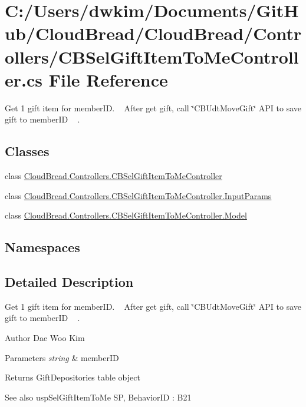 \hypertarget{a00218}{}\section{C\+:/\+Users/dwkim/\+Documents/\+Git\+Hub/\+Cloud\+Bread/\+Cloud\+Bread/\+Controllers/\+C\+B\+Sel\+Gift\+Item\+To\+Me\+Controller.cs File Reference}
\label{a00218}


Get 1 gift item for member\+ID. ~\newline
After get gift, call \char`\"{}\+C\+B\+Udt\+Move\+Gift\char`\"{} A\+PI to save gift to member\+ID ~\newline
.  


\subsection*{Classes}
\begin{DoxyCompactItemize}
\item 
class \hyperlink{a00047}{Cloud\+Bread.\+Controllers.\+C\+B\+Sel\+Gift\+Item\+To\+Me\+Controller}
\item 
class \hyperlink{a00110}{Cloud\+Bread.\+Controllers.\+C\+B\+Sel\+Gift\+Item\+To\+Me\+Controller.\+Input\+Params}
\item 
class \hyperlink{a00151}{Cloud\+Bread.\+Controllers.\+C\+B\+Sel\+Gift\+Item\+To\+Me\+Controller.\+Model}
\end{DoxyCompactItemize}
\subsection*{Namespaces}
\begin{DoxyCompactItemize}
\end{DoxyCompactItemize}


\subsection{Detailed Description}
Get 1 gift item for member\+ID. ~\newline
After get gift, call \char`\"{}\+C\+B\+Udt\+Move\+Gift\char`\"{} A\+PI to save gift to member\+ID ~\newline
. 

\begin{DoxyAuthor}{Author}
Dae Woo Kim 
\end{DoxyAuthor}

\begin{DoxyParams}{Parameters}
{\em string} & member\+ID \\
\hline
\end{DoxyParams}
\begin{DoxyReturn}{Returns}
Gift\+Depositories table object 
\end{DoxyReturn}
\begin{DoxySeeAlso}{See also}
usp\+Sel\+Gift\+Item\+To\+Me SP, Behavior\+ID \+: B21 
\end{DoxySeeAlso}

